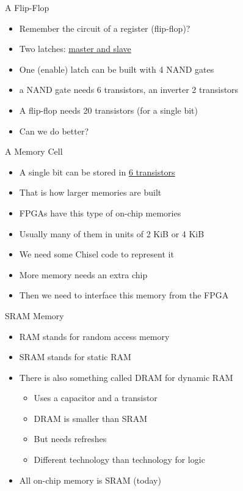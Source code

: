 \begin{frame}[fragile]{A Flip-Flop}
\begin{itemize}
\item Remember the circuit of a register (flip-flop)?
\item Two latches: \href{https://en.wikipedia.org/wiki/Flip-flop_(electronics)#Master%E2%80%93slave_edge-triggered_D_flip-flop}{master and slave}
\item One (enable) latch can be built with 4 NAND gates
\item a NAND gate needs 6 transistors, an inverter 2 transistors
\item A flip-flop needs 20 transistors (for a single bit)
\item Can we do better?
\end{itemize}
\end{frame}

\begin{frame}[fragile]{A Memory Cell}
\begin{itemize}
\item A single bit can be stored in \href{https://en.wikipedia.org/wiki/Static_random-access_memory#/media/File:SRAM_Cell_(6_Transistors).svg}{6 transistors}
\item That is how larger memories are built
\item FPGAs have this type of on-chip memories
\item Usually many of them in units of 2 KiB or 4 KiB
\item We need some Chisel code to represent it
\item More memory needs an extra chip
\item Then we need to interface this memory from the FPGA
\end{itemize}
\end{frame}

\begin{frame}[fragile]{SRAM Memory}
\begin{itemize}
\item RAM stands for random access memory
\item SRAM stands for static RAM
\item There is also something called DRAM for dynamic RAM
\begin{itemize}
\item Uses a capacitor and a transistor
\item DRAM is smaller than SRAM
\item But needs refreshes
\item Different technology than technology for logic
\end{itemize}
\item All on-chip memory is SRAM (today)
\end{itemize}
\end{frame}

